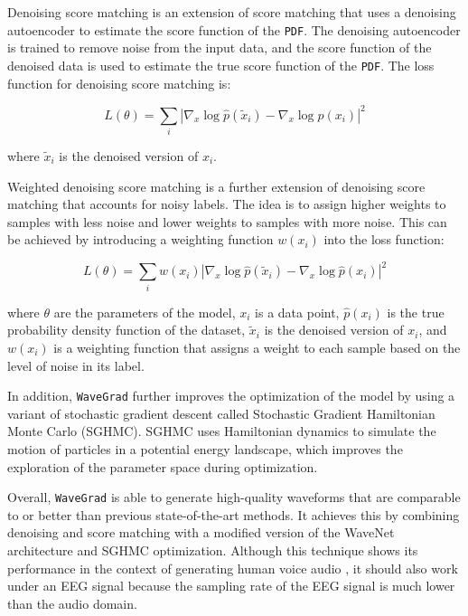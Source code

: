 \documentclass[runningheads]{llncs}
\begin{document}
Denoising score matching is an extension of score matching that uses a denoising autoencoder to estimate the score function of the \texttt{PDF}. The denoising autoencoder is trained to remove noise from the input data, and the score function of the denoised data is used to estimate the true score function of the \texttt{PDF}. The loss function for denoising score matching is:

\begin{equation}
L(\theta) = \sum_i |\nabla_x \log \hat{p}(\tilde{x}_i) - \nabla_x \log \hat{p}(x_i)|^2
\end{equation}

where $\tilde{x}_i$ is the denoised version of $x_i$.

Weighted denoising score matching is a further extension of denoising score matching that accounts for noisy labels. The idea is to assign higher weights to samples with less noise and lower weights to samples with more noise. This can be achieved by introducing a weighting function $w(x_i)$ into the loss function:

\begin{equation}
L(\theta) = \sum_i w(x_i) |\nabla_x \log \hat{p}(\tilde{x}_i) - \nabla_x \log \hat{p}(x_i)|^2
\end{equation}

where $\theta$ are the parameters of the model, $x_i$ is a data point, $\hat{p}(x_i)$ is the true probability density function of the dataset, $\tilde{x}_i$ is the denoised version of $x_i$, and $w(x_i)$ is a weighting function that assigns a weight to each sample based on the level of noise in its label.

In addition, \texttt{WaveGrad} further improves the optimization of the model by using a variant of stochastic gradient descent called Stochastic Gradient Hamiltonian Monte Carlo (SGHMC). SGHMC uses Hamiltonian dynamics to simulate the motion of particles in a potential energy landscape, which improves the exploration of the parameter space during optimization.

Overall, \texttt{WaveGrad} is able to generate high-quality waveforms that are comparable to or better than previous state-of-the-art methods. It achieves this by combining denoising and score matching with a modified version of the WaveNet architecture and SGHMC optimization. Although this technique shows its performance in the context of generating human voice audio \cite{chen2020wavegrad}, it should also work under an EEG signal because the sampling rate of the EEG signal is much lower than the audio domain.
\end{document}
